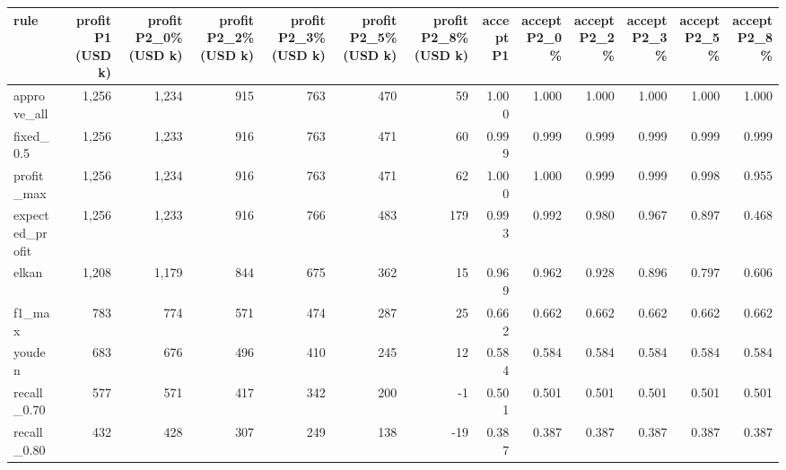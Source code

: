 \begin{tabular}{lrrrrrrrrrrrr}
\toprule
rule & profit P1 (USD k) & profit P2\_0\% (USD k) & profit P2\_2\% (USD k) & profit P2\_3\% (USD k) & profit P2\_5\% (USD k) & profit P2\_8\% (USD k) & accept P1 & accept P2\_0\% & accept P2\_2\% & accept P2\_3\% & accept P2\_5\% & accept P2\_8\% \\
\midrule
approve\_all & 1,256 & 1,234 & 915 & 763 & 470 & 59 & 1.000 & 1.000 & 1.000 & 1.000 & 1.000 & 1.000 \\
fixed\_0.5 & 1,256 & 1,233 & 916 & 763 & 471 & 60 & 0.999 & 0.999 & 0.999 & 0.999 & 0.999 & 0.999 \\
profit\_max & 1,256 & 1,234 & 916 & 763 & 471 & 62 & 1.000 & 1.000 & 0.999 & 0.999 & 0.998 & 0.955 \\
expected\_profit & 1,256 & 1,233 & 916 & 766 & 483 & 179 & 0.993 & 0.992 & 0.980 & 0.967 & 0.897 & 0.468 \\
elkan & 1,208 & 1,179 & 844 & 675 & 362 & 15 & 0.969 & 0.962 & 0.928 & 0.896 & 0.797 & 0.606 \\
f1\_max & 783 & 774 & 571 & 474 & 287 & 25 & 0.662 & 0.662 & 0.662 & 0.662 & 0.662 & 0.662 \\
youden & 683 & 676 & 496 & 410 & 245 & 12 & 0.584 & 0.584 & 0.584 & 0.584 & 0.584 & 0.584 \\
recall\_0.70 & 577 & 571 & 417 & 342 & 200 & -1 & 0.501 & 0.501 & 0.501 & 0.501 & 0.501 & 0.501 \\
recall\_0.80 & 432 & 428 & 307 & 249 & 138 & -19 & 0.387 & 0.387 & 0.387 & 0.387 & 0.387 & 0.387 \\
\bottomrule
\end{tabular}
